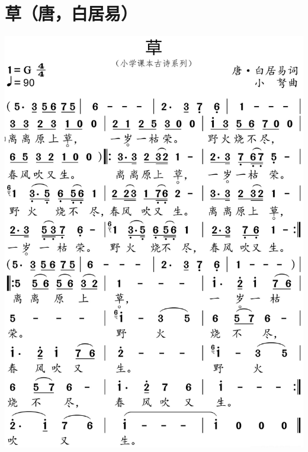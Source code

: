 \documentclass[cn,pad,chinesefont=nofont,twocol]{elegantbook}
\begin{document}
\section{草（唐，白居易）}
    \includegraphics[width=\textwidth]{dongxiao/20200627-古诗-草.jpg}   
\end{document}
